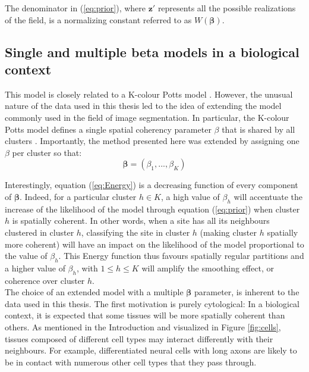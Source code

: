 The denominator in (\ref{eq:prior}), where $\boldsymbol{z'}$ represents all the possible realizations of the field, is a normalizing constant referred to as $W(\boldsymbol{\beta})$.\\

	\subsection{Single and multiple beta models in a biological context}
This model is closely related to a K-colour Potts model \cite{Wu82}. However, the unusual nature of the data used in this thesis led to the idea of extending the model commonly used in the field of image segmentation. In particular, the K-colour Potts model defines a single spatial coherency parameter $\beta$ that is shared by all clusters \cite{subudhi14,zhang14}. Importantly, the method presented here was extended by assigning one $\beta$ per cluster so that:
\begin{equation*}
\label{eq:beta}
\boldsymbol{\beta} = (\beta_{1},...,\beta_{K})
\end{equation*}

 Interestingly, equation (\ref{eq:Energy}) is a decreasing function of every component of $\boldsymbol{\beta}$. Indeed, for a particular cluster $h \in K$, a high value of $\beta_h$ will accentuate the increase of the likelihood of the model through equation (\ref{eq:prior}) when cluster $h$ is spatially coherent. In other words, when a site has all its neighbours clustered in cluster $h$, classifying the site in cluster $h$ (making cluster $h$ spatially more coherent) will have an impact on the likelihood of the model proportional to the value of $\beta_h$. This Energy function thus favours spatially regular partitions and a higher value of $\beta_h$, with $1 \leq h \leq K $ will amplify the smoothing effect, or coherence over cluster $h$.\\
 
 The choice of an extended model with a multiple $\boldsymbol{\beta}$ parameter, is inherent to the data used in this thesis. The first motivation is purely cytological: In a biological context, it is expected that some tissues will be more spatially coherent than others. As mentioned in the Introduction and visualized in Figure \ref{fig:cells}, tissues composed of different cell types may interact differently with their neighbours. For example, differentiated neural cells with long axons are likely to be in contact with numerous other cell types that they pass through.\\
 
